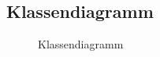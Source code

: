 \subsection{Klassendiagramm}
\label{app:Klassendiagramm}
\begin{figure}[htb]
\centering
{}
\caption{Klassendiagramm}
\label{fig:komp_dia}
\end{figure}